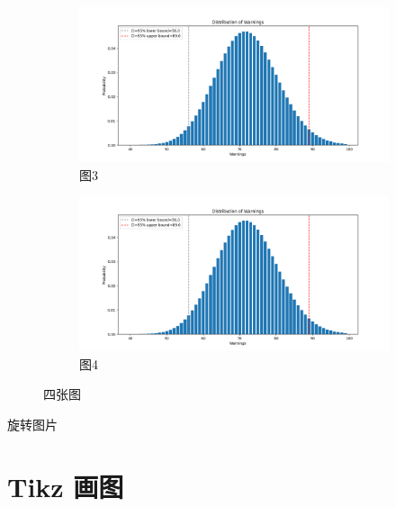\documentclass{cls/simplereport}
\begin{document}
\begin{figure}[h]
	\begin{subfigure}{0.4\textwidth}
		\centering
		\includegraphics[width=\textwidth]{example-report-gfx/eg_dist}
		\caption{图3}
		\label{fig:image3}
	\end{subfigure}
	\quad
	\begin{subfigure}{0.4\textwidth}
		\centering
		\includegraphics[width=\textwidth]{example-report-gfx/eg_dist}
		\caption{图4}
		\label{fig:image4}
	\end{subfigure}
	\caption{四张图}
\end{figure}

\noindent 旋转图片
\begin{center}
\end{center}
	
	
\section{Tikz 画图}
\end{document}
